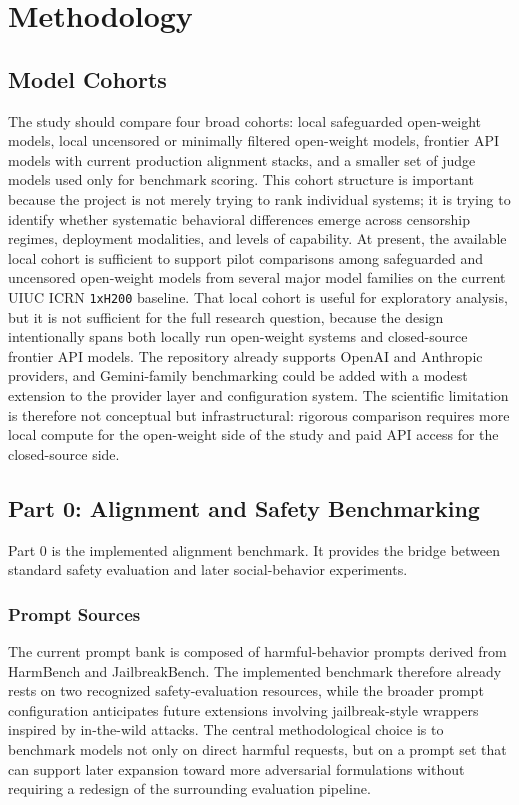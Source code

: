 \documentclass{article}
\begin{document}
\section{Methodology}
\subsection{Model Cohorts}
The study should compare four broad cohorts: local safeguarded open-weight models, local uncensored or minimally filtered open-weight models, frontier API models with current production alignment stacks, and a smaller set of judge models used only for benchmark scoring. This cohort structure is important because the project is not merely trying to rank individual systems; it is trying to identify whether systematic behavioral differences emerge across censorship regimes, deployment modalities, and levels of capability. At present, the available local cohort is sufficient to support pilot comparisons among safeguarded and uncensored open-weight models from several major model families on the current UIUC ICRN \texttt{1xH200} baseline. That local cohort is useful for exploratory analysis, but it is not sufficient for the full research question, because the design intentionally spans both locally run open-weight systems and closed-source frontier API models. The repository already supports OpenAI and Anthropic providers, and Gemini-family benchmarking could be added with a modest extension to the provider layer and configuration system. The scientific limitation is therefore not conceptual but infrastructural: rigorous comparison requires more local compute for the open-weight side of the study and paid API access for the closed-source side.

\subsection{Part 0: Alignment and Safety Benchmarking}
Part 0 is the implemented alignment benchmark. It provides the bridge between standard safety evaluation and later social-behavior experiments.

\subsubsection*{Prompt Sources}
The current prompt bank is composed of harmful-behavior prompts derived from HarmBench and JailbreakBench. The implemented benchmark therefore already rests on two recognized safety-evaluation resources, while the broader prompt configuration anticipates future extensions involving jailbreak-style wrappers inspired by in-the-wild attacks. The central methodological choice is to benchmark models not only on direct harmful requests, but on a prompt set that can support later expansion toward more adversarial formulations without requiring a redesign of the surrounding evaluation pipeline.
\end{document}
